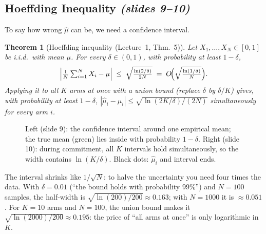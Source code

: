 \documentclass[11pt,a4paper]{article}
\newcommand{\slides}[1]{\emph{(slides #1)}}
\theoremstyle{plain}
\newtheorem{theorem}{Theorem}[section]
\theoremstyle{definition}
\theoremstyle{remark}
\begin{document}
\subsection{Hoeffding Inequality \slides{9--10}}

To say how wrong $\hat\mu$ can be, we need a confidence interval.

\begin{theorem}[Hoeffding inequality (Lecture~1, Thm.~5)]\label{thm:hoeffding}
Let $X_1,\dots,X_N\in[0,1]$ be i.i.d.\ with mean $\mu$. For every $\delta\in(0,1)$, with probability at least $1-\delta$,
\[
 \Bigl|\tfrac1N\textstyle\sum_{i=1}^N X_i-\mu\Bigr|\;\le\;\sqrt{\frac{\ln(2/\delta)}{2N}} \;=\;O\!\Bigl(\sqrt{\tfrac{\ln(1/\delta)}{N}}\Bigr).
\]
Applying it to all $K$ arms at once with a union bound (replace $\delta$ by $\delta/K$) gives, with probability at least $1-\delta$,
$|\hat\mu_i-\mu_i|\le\sqrt{\ln(2K/\delta)/(2N)}$ \emph{simultaneously} for every arm $i$.
\end{theorem}

\begin{figure}[ht]
\centering
{}
\caption{Left (slide 9): the confidence interval around one empirical mean; the true mean (green) lies inside with
probability $1-\delta$. Right (slide 10): during commitment, all $K$ intervals hold simultaneously, so the width
contains $\ln(K/\delta)$. Black dots: $\hat\mu_i$ and interval ends.}
\end{figure}

\begin{intuition}
The interval shrinks like $1/\sqrt N$: to halve the uncertainty you need four times the data. With $\delta=0.01$
(``the bound holds with probability 99\%'') and $N=100$ samples, the half-width is
$\sqrt{\ln(200)/200}\approx0.163$; with $N=1000$ it is $\approx0.051$. For $K=10$ arms and $N=100$, the union bound
makes it $\sqrt{\ln(2000)/200}\approx0.195$: the price of ``all arms at once'' is only logarithmic in $K$.
\end{intuition}
\end{document}
